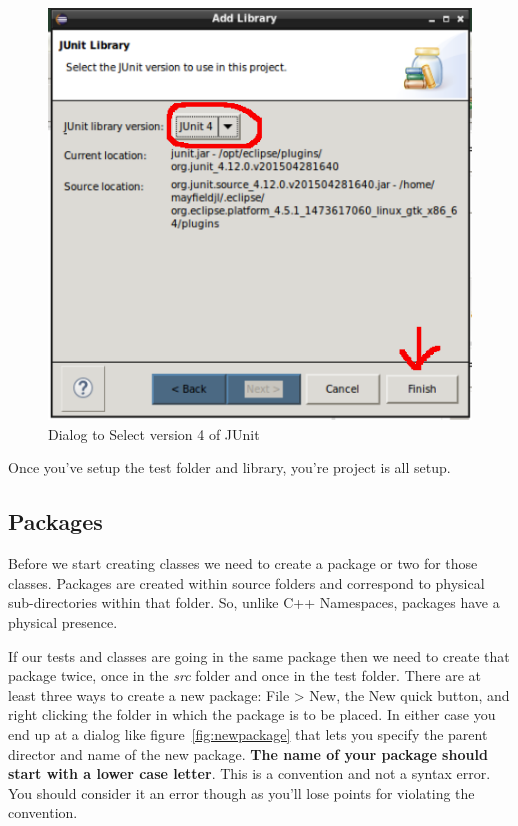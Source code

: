 \documentclass[nobib]{tufte-handout}
\begin{document}
\vspace{.1in}
\begin{center}
\begin{figure}[!htb]
\includegraphics[scale=.5]{Eclipse-SelectJUnit4.png}
\caption{Dialog to Select version 4 of JUnit }
\label{fig:SelectJUnit4}
\end{figure}
\end{center}
\vspace{.1in}

Once you've setup the test folder and library, you're project is all setup.

\subsection{Packages}

Before we start creating classes we need to create a package or two for those classes. Packages are created within source folders and correspond to physical sub-directories within that folder. So, unlike C++ Namespaces, packages have a physical presence.

If our tests and classes are going in the same package then we need to create that package twice, once in the \textit{src} folder and once in the test folder. There are at least three ways to create a new package: File > New, the New quick button, and right clicking the folder in which the package is to be placed. In either case you end up at a dialog like figure~\ref{fig:newpackage} that lets you specify the parent director and name of the new package. \textbf{The name of your package should start with a lower case letter}. This is a convention and not a syntax error.  You should consider it an error though as you'll lose points for violating the convention.
\end{document}
